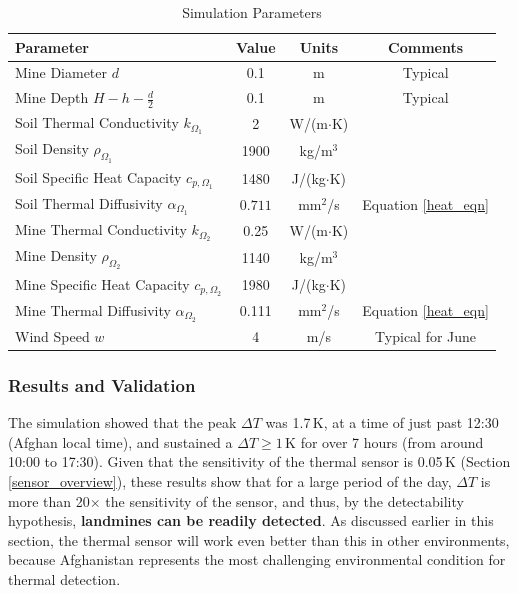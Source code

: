         \begin{table}[ht]
        \centering
        \begin{tabular}{lccc}
        \hline
        \textbf{Parameter} & \textbf{Value} & \textbf{Units} & \textbf{Comments}\\
        \hline
        Mine Diameter \(d\)       & 0.1     & m    & Typical\\
        Mine Depth \(H - h -\frac{d}{2}\)          & 0.1   & m    & Typical\\
        Soil Thermal Conductivity $k_{\Omega_1}$ & 2  & W/(m$\cdot$K) & \cite{szymanik2011soil}\\
        Soil Density $\rho_{\Omega_1}$     & 1900     & kg/m$^3$ & \cite{szymanik2011soil}\\
        Soil Specific Heat Capacity $c_{p,{\Omega_1}}$  & 1480     & J/(kg$\cdot$K) & \cite{szymanik2011soil}\\
        Soil Thermal Diffusivity $\alpha_{\Omega_1}$ & $0.711$ & mm$^2$/s    & Equation \ref{heat_eqn}\\
        Mine Thermal Conductivity $k_{\Omega_2}$ & 0.25  & W/(m$\cdot$K) & \cite{szymanik2011soil}\\
        Mine Density $\rho_{\Omega_2}$      & 1140     & kg/m$^3$ & \cite{szymanik2011soil}\\
        Mine Specific Heat Capacity $c_{p,{\Omega_2}}$ & 1980     & J/(kg$\cdot$K) & \cite{szymanik2011soil}\\
        Mine Thermal Diffusivity $\alpha_{\Omega_2}$ & 0.111 & mm$^2$/s    & Equation \ref{heat_eqn}\\
        Wind Speed \(w\)          & 4      & m/s  & Typical for June \tablefootnote{\url{https://weather-and-climate.com/average-monthly-Wind-speed,Kabul,Afghanistan}}\\
        \hline
        \end{tabular}
        \caption{Simulation Parameters}
        \label{tab:properties}
        \end{table}

   


    \subsubsection{Results and Validation} \label{Results and Validation}
    
         The simulation showed that the peak \(\Delta T\) was 1.7\,K, at a time of just past 12:30 (Afghan local time), and sustained a \(\Delta T \geq 1\)\,K for over 7 hours (from around 10:00 to 17:30). Given that the sensitivity of the thermal sensor is 0.05\,K (Section \ref{sensor_overview}), these results show that for a large period of the day, \(\Delta T\) is more than 20$\times$ the sensitivity of the sensor, and thus, by the detectability hypothesis, \textbf{landmines can be readily detected}. As discussed earlier in this section, the thermal sensor will work even better than this in other environments, because Afghanistan represents the most challenging environmental condition for thermal detection.
    

